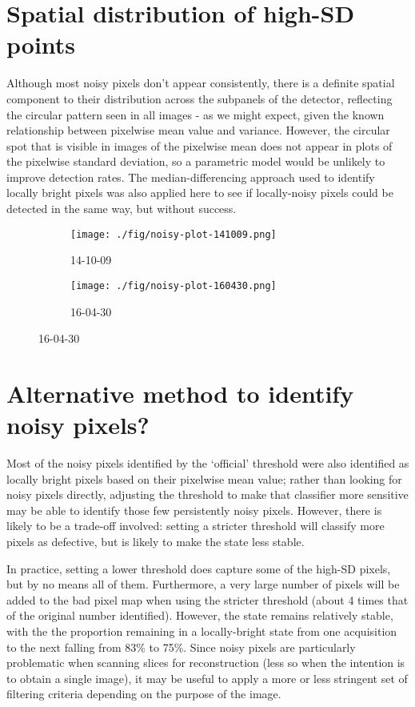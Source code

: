 \documentclass[10pt,fleqn]{article}
\begin{document}
\section{Spatial distribution of high-SD points}

Although most noisy pixels don't appear consistently, there is a definite spatial component to their distribution across the subpanels of the detector, reflecting the circular pattern seen in all images - as we might expect, given the known relationship between pixelwise mean value and variance. However, the circular spot that is visible in images of the pixelwise mean does not appear in plots of the pixelwise standard deviation, so a parametric model would be unlikely to improve detection rates. The median-differencing approach used to identify locally bright pixels was also applied here to see if locally-noisy pixels could be detected in the same way, but without success.

\begin{figure}[!ht]
\caption{Spatial arrangement of noisy pixels not otherwise identified as defective}
\label{fig:time-diffs}
\begin{subfigure}[t]{0.49\textwidth}
\caption{14-10-09}
\texttt{[image: ./fig/noisy-plot-141009.png]}
\end{subfigure}
\begin{subfigure}[t]{0.49\textwidth}
\caption{16-04-30}
\texttt{[image: ./fig/noisy-plot-160430.png]}
\end{subfigure}

\end{figure}
%

\section{Alternative method to identify noisy pixels?}

Most of the noisy pixels identified by the `official' threshold were also identified as locally bright pixels based on their pixelwise mean value; rather than looking for noisy pixels directly, adjusting the threshold to make that classifier more sensitive may be able to identify those few persistently noisy pixels. However, there is likely to be a trade-off involved: setting a stricter threshold will classify more pixels as defective, but is likely to make the state less stable. 

In practice, setting a lower threshold does capture some of the high-SD pixels, but by no means all of them. Furthermore, a very large number of pixels will be added to the bad pixel map when using the stricter threshold (about 4 times that of the original number identified). However, the state remains relatively stable, with the the proportion remaining in a locally-bright state from one acquisition to the next falling from 83\% to 75\%. Since noisy pixels are particularly problematic when scanning slices for reconstruction (less so when the intention is to obtain a single image), it may be useful to apply a more or less stringent set of filtering criteria depending on the purpose of the image.
\end{document}
